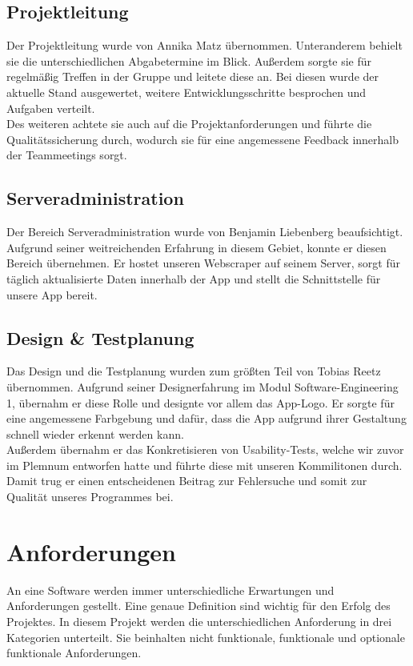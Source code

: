 \documentclass[conference]{IEEEtran}
\begin{document}
\subsection{Projektleitung}
Der Projektleitung wurde von Annika Matz übernommen. Unteranderem behielt sie die unterschiedlichen Abgabetermine im Blick. Außerdem sorgte sie für regelmäßig Treffen in der Gruppe und leitete diese an. Bei diesen wurde der aktuelle Stand ausgewertet, weitere Entwicklungsschritte besprochen und Aufgaben verteilt. \\
Des weiteren achtete sie auch auf die Projektanforderungen und führte die Qualitätssicherung durch, wodurch sie für eine angemessene Feedback innerhalb der Teammeetings sorgt.

\subsection{Serveradministration}
Der Bereich Serveradministration wurde von Benjamin Liebenberg beaufsichtigt. Aufgrund seiner weitreichenden Erfahrung in diesem Gebiet, konnte er diesen Bereich übernehmen. Er hostet unseren Webscraper auf seinem Server, sorgt für täglich aktualisierte Daten innerhalb der App und stellt die Schnittstelle für unsere App bereit.

\subsection{Design \& Testplanung}
Das Design und die Testplanung wurden zum größten Teil von Tobias Reetz übernommen. Aufgrund seiner Designerfahrung im Modul Software-Engineering 1, übernahm er diese Rolle und designte vor allem das App-Logo. Er sorgte für eine angemessene Farbgebung und dafür, dass die App aufgrund ihrer Gestaltung schnell wieder erkennt werden kann. \\
Außerdem übernahm er das Konkretisieren von Usability-Tests, welche wir zuvor im Plemnum entworfen hatte und führte diese mit unseren Kommilitonen durch. Damit trug er einen entscheidenen Beitrag zur Fehlersuche und somit zur Qualität unseres Programmes bei.

\section{Anforderungen}
An eine Software werden immer unterschiedliche Erwartungen und Anforderungen gestellt. Eine genaue Definition sind wichtig für den Erfolg des Projektes. In diesem Projekt werden die unterschiedlichen Anforderung in drei Kategorien unterteilt. Sie beinhalten nicht funktionale, funktionale und optionale funktionale Anforderungen.
\end{document}
